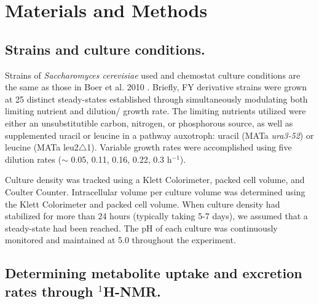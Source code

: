\documentclass[12pt]{nature}\usepackage{graphicx, color}
\begin{document}
\newcommand{\multilineR}[1]{\begin{tabular}[b]{@{}r@{}}#1\end{tabular}}
\newcommand{\multilineL}[1]{\begin{tabular}[b]{@{}l@{}}#1\end{tabular}}
\newcommand{\multilineC}[1]{\begin{tabular}[b]{@{}c@{}}#1\end{tabular}}

\section*{Materials and Methods}

\subsection{Strains and culture conditions.} 

Strains of \textit{Saccharomyces cerevisiae} used and chemostat culture conditions are the same as those in Boer et al. 2010 \cite{main-Boer:2010fb}.  Briefly, FY derivative strains were grown at 25 distinct steady-states established through simultaneously modulating both limiting nutrient and dilution/ growth rate. The limiting nutrients utilized were either an unsubstitutible carbon, nitrogen, or phosphorous source, as well as supplemented uracil or leucine in a pathway auxotroph: uracil (MATa \textit{ura3-52}) or leucine (MATa leu2$\bigtriangleup$1).  Variable growth rates were accomplished using five dilution rates ($\sim$ 0.05, 0.11, 0.16, 0.22, 0.3 h$^{-1}$).

Culture density was tracked using a Klett Colorimeter, packed cell volume, and Coulter Counter. Intracellular volume per culture volume was determined using the Klett Colorimeter and packed cell volume.  When culture density had stabilized for more than 24 hours (typically taking 5-7 days), we assumed that a steady-state had been reached.  The pH of each culture was continuously monitored and maintained at 5.0 throughout the experiment.

\subsection{Determining metabolite uptake and excretion rates through $^{1}$H-NMR.}
\end{document}
